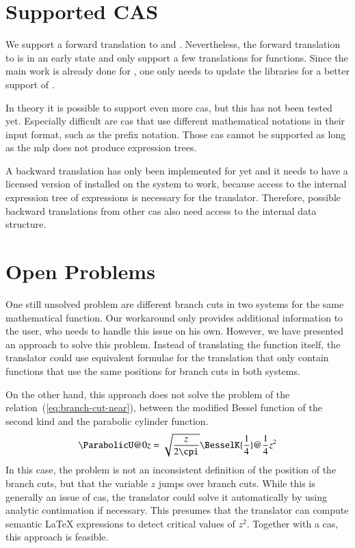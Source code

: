 \section{Supported CAS}
We support a forward translation to \Maple{} and \Mathematica. Nevertheless, the forward translation to \Mathematica{} is in an early state and only support a few translations for functions. Since the main work is already done for \Maple{}, one only needs to update the libraries for a better support of \Mathematica.

In theory it is possible to support even more \gls{cas}, but this has not been tested yet. Especially difficult are \gls{cas} that use different mathematical notations in their input format, such as the prefix notation. Those \gls{cas} cannot be supported as long as the \gls{mlp} does not produce expression trees. 

A backward translation has only been implemented for \Maple{} yet and it needs to have a licensed version of \Maple{} installed on the system to work, because access to the internal expression tree of \Maple{} expressions is necessary for the translator. Therefore, possible backward translations from other \gls{cas} also need access to the internal data structure.

\section{Open Problems}
One still unsolved problem are different branch cuts in two systems for the same mathematical function. Our workaround only provides additional information to the user, who needs to handle this issue on his own. However, we have presented an approach to solve this problem. Instead of translating the function itself, the translator could use equivalent formulae for the translation that only contain functions that use the same positions for branch cuts in both systems.

On the other hand, this approach does not solve the problem of the relation~(\ref{eq:branch-cut-near}), between the modified Bessel function of the second kind and the parabolic cylinder function. 
\begin{equation*}
\displaystyle \ParabolicU@{0}{z} = \sqrt{\frac{z}{2\cpi}}\BesselK{\frac{1}{4}}@{\frac{1}{4}z^2}
\end{equation*}
In this case, the problem is not an inconsistent definition of the position of the branch cuts, but that the variable $z$ jumps over branch cuts. While this is generally an issue of \gls{cas}, the translator could solve it automatically by using analytic continuation if necessary. This presumes that the translator can compute semantic \LaTeX{} expressions to detect critical values of $z^2$. Together with a \gls{cas}, this approach is feasible.

